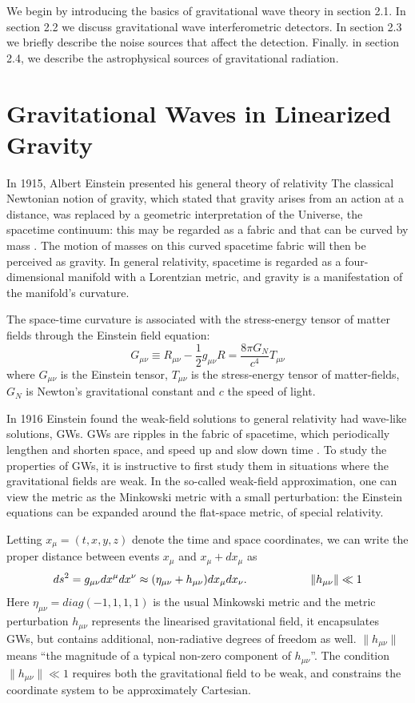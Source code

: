 \documentclass[binding=0.6cm, LaM]{sapthesis}
\begin{document}
	We begin by introducing the basics of gravitational wave theory in section 2.1. 
	In section 2.2 we discuss gravitational wave interferometric detectors. 
	In section 2.3 we briefly describe the noise sources that affect the detection. 
	Finally. in section 2.4, we describe the astrophysical sources of gravitational radiation.

\section{Gravitational Waves in Linearized Gravity}

	In 1915, Albert Einstein presented his general theory of relativity
	The classical Newtonian notion of gravity, which stated that gravity arises from an 
	action at a distance, was replaced by a geometric interpretation of the Universe, 
	the spacetime continuum: this may be regarded as a fabric and that can be curved 
	by mass \cite{1}. 
	The motion of masses on this curved spacetime fabric will then be perceived as gravity. 
	In general relativity, spacetime is regarded as a four-dimensional manifold 
	with a Lorentzian metric, and gravity is a manifestation of the manifold’s curvature.

	The space-time curvature is associated with the stress-energy tensor 
	of matter fields through the Einstein field equation:
		\begin{equation}
		G_{\mu\nu} \equiv R_{\mu\nu}  - {\frac{1}{2}}g_{\mu\nu}R = \frac{8\pi G_{N}}{c^4}T_{\mu\nu} 
		\end{equation}
	where $G_{\mu\nu} $ is the Einstein tensor, $T_{\mu\nu} $ is the stress-energy 
	tensor of matter-fields, $ G_{N}$ is Newton’s gravitational constant and $c$ the speed of light.

	In 1916 Einstein found the weak-field solutions to general relativity had wave-like solutions, GWs.
	GWs are ripples in the fabric of spacetime, 
	which periodically lengthen and shorten space, and speed up and slow down time \cite{2}.
 	To study the properties of GWs, it is instructive to first study them 
	in situations where the gravitational fields are weak.
	In the so-called weak-field approximation, one can view the metric as the Minkowski metric 
	with a small perturbation: the Einstein equations can be expanded around the flat-space metric, of special relativity.

	Letting $ x_\mu = (t, x, y, z)$ denote the time and space coordinates, 
	we can write the proper distance between events $x_{\mu}$ and $x_{\mu} + dx_{\mu}$ as
		\[
		ds^2 = g_{\mu\nu}dx^{\mu}dx^{\nu} \approx (\eta_{\mu\nu} + h_{\mu\nu})dx_{\mu}dx_{\nu}. \hspace*{2cm}\|h_{\mu\nu}\|\ll 1
		\]
	Here $\eta_{\mu\nu} = diag(-1,1,1,1)$ is the usual Minkowski metric and the metric perturbation  $h_{\mu\nu}$        
	represents the linearised gravitational field, it encapsulates GWs, 
	but contains additional, non-radiative degrees of freedom as well. $\|h_{\mu\nu}\|$ means
	“the magnitude of a typical non-zero component of $h_{\mu\nu}$”. 
	The condition $\|h_{\mu\nu}\|\ll 1$ requires both the gravitational field to be weak, 
	and constrains the coordinate system to be approximately Cartesian.
\end{document}
